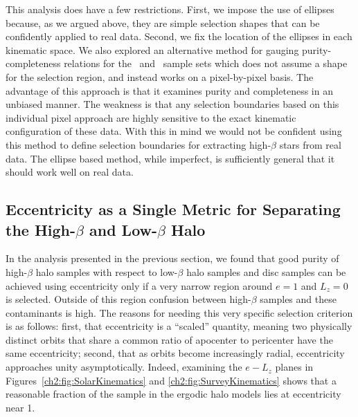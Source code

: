 This analysis does have a few restrictions. First, we impose the use of ellipses because, as we argued above, they are simple selection shapes that can be confidently applied to real data. Second, we fix the location of the ellipses in each kinematic space. We also explored an alternative method for gauging purity-completeness relations for the \solar\ and \survey\ sample sets which does not assume a shape for the selection region, and instead works on a pixel-by-pixel basis. The advantage of this approach is that it examines purity and completeness in an unbiased manner. The weakness is that any selection boundaries based on this individual pixel approach are highly sensitive to the exact kinematic configuration of these data. With this in mind we would not be confident using this method to define selection boundaries for extracting high-$\beta$ stars from real data. The ellipse based method, while imperfect, is sufficiently general that it should work well on real data.

\subsection{Eccentricity as a Single Metric for Separating the High-\texorpdfstring{$\beta$}{beta} and Low-\texorpdfstring{$\beta$}{beta} Halo}
\label{ch2:subsec:EccentricityHaloSeparation}

In the analysis presented in the previous section, we found that good purity of high-$\beta$ halo samples with respect to low-$\beta$ halo samples and disc samples can be achieved using eccentricity only if a very narrow region around $e=1$ and $L_{z}=0$ is selected. Outside of this region confusion between high-$\beta$ samples and these contaminants is high. The reasons for needing this very specific selection criterion is as follows: first, that eccentricity is a ``scaled'' quantity, meaning two physically distinct orbits that share a common ratio of apocenter to pericenter have the same eccentricity; second, that as orbits become increasingly radial, eccentricity approaches unity asymptotically. Indeed, examining the $e-L_{z}$ planes in Figures~\ref{ch2:fig:SolarKinematics} and \ref{ch2:fig:SurveyKinematics} shows that a reasonable fraction of the sample in the ergodic halo models lies at eccentricity near 1.

